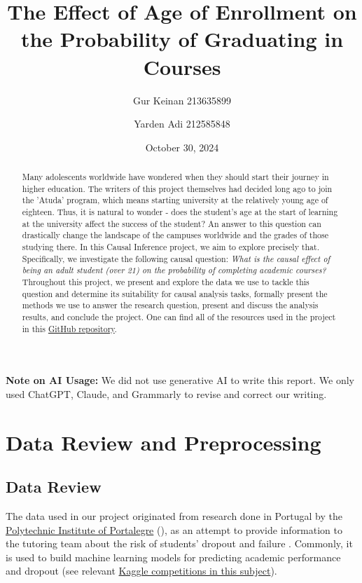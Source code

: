 \documentclass[11pt]{article}
\title{The Effect of Age of Enrollment on the Probability of Graduating in Courses}
\author{Gur Keinan 213635899 \and Yarden Adi 212585848}
\date{October 30, 2024}
\newcommand{\gur}[1]{{\color{teal}{Gur: #1}}}
\begin{document}
\maketitle

\begin{abstract}
    Many adolescents worldwide have wondered when they should start their journey in higher education. The writers of this project themselves had decided long ago to join the 'Atuda' program, which means starting university at the relatively young age of eighteen. Thus, it is natural to wonder - does the student's age at the start of learning at the university affect the success of the student? An answer to this question can drastically change the landscape of the campuses worldwide and the grades of those studying there. In this Causal Inference project, we aim to explore precisely that. Specifically, we investigate the following causal question: \emph{What is the causal effect of being an adult student (over 21) on the probability of completing academic courses?} Throughout this project, we present and explore the data we use to tackle this question and determine its suitability for causal analysis tasks, formally present the methods we use to answer the research question, present and discuss the analysis results, and conclude the project. One can find all of the resources used in the project in this \href{https://github.com/GurKeinan/Causal-Inference-Project-Effect-of-Age-on-Graduating}{GitHub repository}.
\end{abstract}

\gur{It seems that target is the variable of "completed his studies", and course is not a single "calculus 1" but more like a degree. It is important, we should revise our work based on it.}

\textbf{Note on AI Usage:} We did not use generative AI to write this report. We only used ChatGPT, Claude, and Grammarly to revise and correct our writing.

\section{Data Review and Preprocessing}

\gur{Opening sentence.}

\subsection{Data Review}

The data used in our project originated from research done in Portugal by the \href{https://www.ipportalegre.pt/pt/}{Polytechnic Institute of Portalegre} (\gur{Equivalent to college}), as an attempt to provide information to the tutoring team about the risk of students' dropout and failure \citep{data7110146}. Commonly, it is used to build machine learning models for predicting academic performance and dropout (see relevant \href{https://www.kaggle.com/datasets/ankanhore545/dropout-or-academic-success/data}{Kaggle competitions in this subject}).
\end{document}
